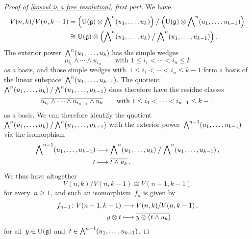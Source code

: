 \begin{proof}[Proof of \cref{koszul is a free resolution}, first part]
	We have
	\begin{align*}
		V(n,k) / V(n, k-1)
		&=
		\Bigl( \operatorname{U}(\mathfrak{g}) \otimes \operatorname{\bigwedge}^n( u_1, \dotsc, u_k ) \Bigr)
		\mathbin{\big/}
		\Bigl( \operatorname{U}(\mathfrak{g}) \otimes \operatorname{\bigwedge}^n( u_1, \dotsc, u_{k-1} ) \Bigr)
		\\
		&\cong
		\operatorname{U}(\mathfrak{g})
		\otimes
		\Bigl(
			\operatorname{\bigwedge}^n( u_1, \dotsc, u_k )
			\mathbin{\big/}
			\operatorname{\bigwedge}^n( u_1, \dotsc, u_{k-1} )
		\Bigr) \,.
	\end{align*}
	The exterior power~$\operatorname{\bigwedge}^n( u_1, \dotsc, u_k )$ has the simple wedges
	\[
		u_{i_1} \wedge \dotsb \wedge u_{i_n}
		\qquad
		\text{with~$1 \leq i_1 < \dotsb < i_n \leq k$}
	\]
	as a basis, and those simple wedges with~$1 \leq i_1 < \dotsb < i_n \leq k-1$ form a basis of the linear subspace~$\operatorname{\bigwedge}^n( u_1, \dotsc, u_{k-1} )$.
	The quotient~$\operatorname{\bigwedge}^n(u_1, \dotsc, u_k) \mathbin{/} \operatorname{\bigwedge}^n(u_1, \dotsc, u_{k-1})$ does therefore have the residue classes
	\[
		\overline{ u_{i_1} \wedge \dotsb \wedge u_{i_{n-1}} \wedge u_k }
		\qquad
		\text{with~$1 \leq i_1 < \dotsb < i_{n-1} \leq k-1$}
	\]
	as a basis.
	We can therefore identify the quotient~$\operatorname{\bigwedge}^n(u_1, \dotsc, u_k) \mathbin{/} \operatorname{\bigwedge}^n(u_1, \dotsc, u_{k-1})$ with the exterior power~$\operatorname{\bigwedge}^{n-1}(u_1, \dotsc, u_{k-1})$ via the isomorphism
	\begin{align*}
		\Exterior^{n-1}(u_1, \dotsc, u_{k-1})
		&\to
		\Exterior^n(u_1, \dotsc, u_k)
		\mathbin{\big/}
		\Exterior^n(u_1, \dotsc, u_{k-1}) \,,
		\\
		t
		&\mapsto
		\class{ t \wedge u_k } \,.
	\end{align*}
	We thus have altogether
	\[
		V(n, k) / V(n, k-1)
		\cong
		V(n-1, k-1)
	\]
	for every~$n \geq 1$, and such an isomorphism~$f_n$ is given by
	\begin{align*}
		f_{n-1}
		\colon
		V(n-1, k-1)
		&\to
		V(n,k) / V(n,k-1) \,,
		\\
		y \otimes t
		&\mapsto
		\class{ y \otimes (t \wedge u_k) }
	\end{align*}
	for all~$y \in \operatorname{U}(\mathfrak{g})$ and~$t \in \operatorname{\bigwedge}^{n-1}(u_1, \dotsc, u_{k-1})$.


\end{proof}

